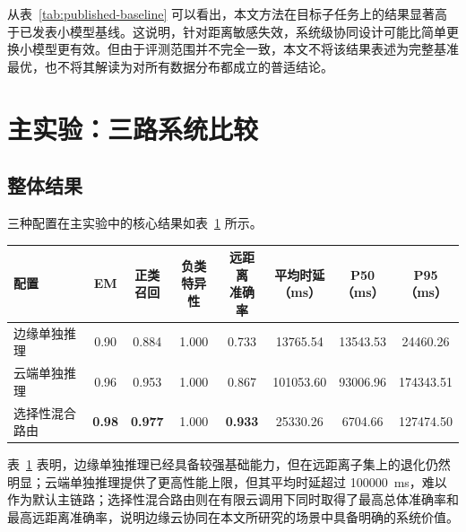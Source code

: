 从表~\ref{tab:published-baseline} 可以看出，本文方法在目标子任务上的结果显著高于已发表小模型基线。这说明，针对距离敏感失效，系统级协同设计可能比简单更换小模型更有效。但由于评测范围并不完全一致，本文不将该结果表述为完整基准最优，也不将其解读为对所有数据分布都成立的普适结论。

\section{主实验：三路系统比较}
\label{sec:exp-main}

\subsection{整体结果}

三种配置在主实验中的核心结果如表~\ref{tab:three-way-main} 所示。

\begin{table}[htbp]
  \centering
  \scriptsize
  \setlength{\tabcolsep}{3.5pt}
  \label{tab:three-way-main}
  \begin{tabularx}{\textwidth}{l c c c c c c c}
    \toprule
    配置 & EM & \shortstack{正类\\召回} & \shortstack{负类\\特异性} & \shortstack{远距离\\准确率} & \shortstack{平均时延\\（ms）} & \shortstack{P50\\（ms）} & \shortstack{P95\\（ms）} \\
    \midrule
    边缘单独推理 & 0.90 & 0.884 & 1.000 & 0.733 & 13765.54 & 13543.53 & 24460.26 \\
    云端单独推理 & 0.96 & 0.953 & 1.000 & 0.867 & 101053.60 & 93006.96 & 174343.51 \\
    选择性混合路由 & \textbf{0.98} & \textbf{0.977} & 1.000 & \textbf{0.933} & 25330.26 & 6704.66 & 127474.50 \\
    \bottomrule
  \end{tabularx}
\end{table}

表~\ref{tab:three-way-main} 表明，边缘单独推理已经具备较强基础能力，但在远距离子集上的退化仍然明显；云端单独推理提供了更高性能上限，但其平均时延超过 \SI{100000}{ms}，难以作为默认主链路；选择性混合路由则在有限云调用下同时取得了最高总体准确率和最高远距离准确率，说明边缘云协同在本文所研究的场景中具备明确的系统价值。

